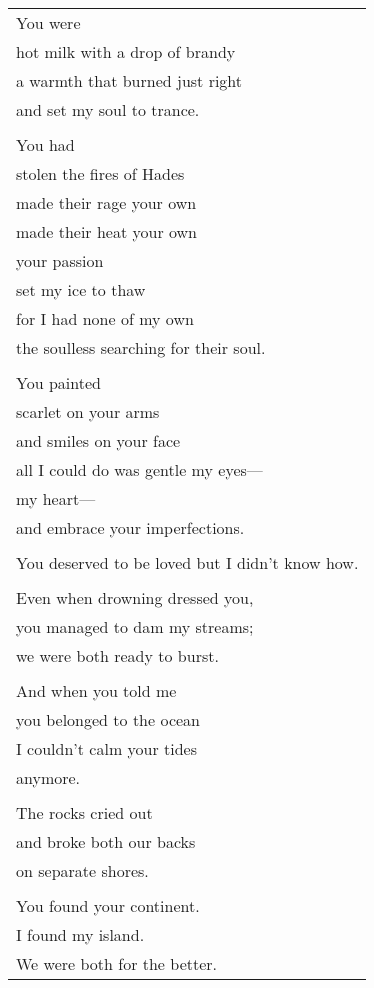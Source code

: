 \documentclass{article}
\begin{document}
\begin{center}
\begin{tabular}{l}
You were \\
hot milk with a drop of brandy \\
a warmth that burned just right \\
and set my soul to trance. \\
\\
You had \\
stolen the fires of Hades \\
made their rage your own \\
made their heat your own \\
your passion \\
set my ice to thaw \\
for I had none of my own \\
the soulless searching for their soul. \\
\\
You painted \\
scarlet on your arms \\
and smiles on your face \\
all I could do was gentle my eyes--- \\
my heart--- \\
and embrace your imperfections. \\
\\
You deserved to be loved but I didn't know how. \\
\\
Even when drowning dressed you, \\
you managed to dam my streams; \\
we were both ready to burst. \\
\\
And when you told me \\
you belonged to the ocean \\
I couldn't calm your tides \\
anymore. \\
\\
The rocks cried out \\
and broke both our backs \\
on separate shores. \\
\\
You found your continent. \\
I found my island. \\
We were both for the better. \\
\end{tabular}
\end{center}
\end{document}
